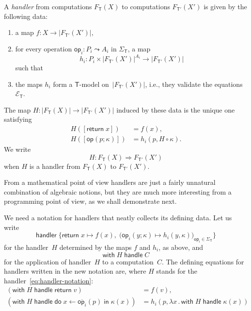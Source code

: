 \documentclass{amsart}
\newcommand{\theory}[1]{\mathsf{#1}} %
\newcommand{\signature}[1]{\Sigma_{\theory{#1}}} %
\newcommand{\equations}[1]{\mathcal{E}_{\theory{#1}}} %
\newcommand{\carrier}[1]{|#1|} %
\newcommand{\Free}[2]{F_{\theory{#1}}(#2)} %
\newcommand{\lam}[1]{\lambda #1 \,.\,}
\newcommand{\op}[1]{\mathsf{op}_{#1}} %
\newcommand{\opdecl}[3]{#1 : #2 \leadsto #3} %
\newcommand{\hto}{\Rightarrow} %
\newcommand{\kode}[1]{\mathsf{#1}}
\newcommand{\seq}[2]{\kode{do}\; #1 \leftarrow #2 \;\kode{in}\;}
\newcommand{\handler}{\kode{handler}\;}
\newcommand{\xopgen}[2]{\overline{#1}(#2)}
\newcommand{\opcall}[3]{\kode{#1}(#2; #3)}
\newcommand{\opclause}[3]{#1(#2; #3) \mapsto}
\newcommand{\return}[1]{\kode{return}\;#1}
\newcommand{\retclause}[1]{\return{#1} \mapsto}
\newcommand{\withhandle}[2]{\kode{with}\; #1\; \kode{handle}\; #2}
\begin{document}
A \emph{handler} from computations $\Free{T}{X}$ to computations $\Free{T'}{X'}$
is given by the following data:
%
\begin{enumerate}
\item a map $f : X \to \carrier{\Free{T'}{X'}}$,
\item for every operation $\opdecl{\op{i}}{P_i}{A_i}$ in $\signature{T}$, a map
  \begin{equation*}
    h_i : P_i \times \carrier{\Free{T'}{X'}}^{A_i} \to \carrier{\Free{T'}{X'}}
  \end{equation*}
  such that
\item the maps $h_i$ form a $\theory{T}$-model on~$\carrier{\Free{T'}{X'}}$, i.e., they
 validate the equations~$\equations{T}$.
\end{enumerate}
%
The map $H : \carrier{\Free{T}{X}} \longrightarrow \carrier{\Free{T'}{X'}}$ induced by these
data is the unique one satisfying
%
\begin{align*}
  H([\return{x}]) &= f(x), \\
  H([\opcall{op}{p}{\kappa}]) &= h_i(p, H \circ \kappa).
\end{align*}
%
We write
%
\begin{equation*}
  H : \Free{T}{X} \hto \Free{T'}{X'}
\end{equation*}
%
when $H$ is a handler from $\Free{T}{X}$ to $\Free{T'}{X'}$.

From a mathematical point of view handlers are just a fairly unnatural
combination of algebraic notions, but they are much more interesting from a
programming point of view, as we shall demonstrate next.

We need a notation for handlers that neatly collects its defining data. Let us write
%
\begin{equation}
  \label{eq:handler-notation}
  \handler \{
    \retclause{x} f(x), \;
    \big( \opclause{\op{i}}{y}{\kappa} h_i(y, \kappa) \big)_{\op{i} \in \signature{T}}
  \}
\end{equation}
%
for the handler~$H$ determined by the maps $f$ and $h_i$, as above, and
%
\begin{equation*}
  \withhandle{H}{C}
\end{equation*}
%
for the application of handler~$H$ to a computation~$C$. The defining
equations for handlers written in the new notation are, where $H$ stands for the
handler~\eqref{eq:handler-notation}:
%
\begin{align*}
  (\withhandle{H}{\return v}) &= f(v), \\
  (\withhandle{H}{\seq{x}{\xopgen{\op{i}}{p}} \kappa(x)}) &=
  h_i (p, \lam{x} \withhandle{H}{\kappa(x)})
\end{align*}
\end{document}
